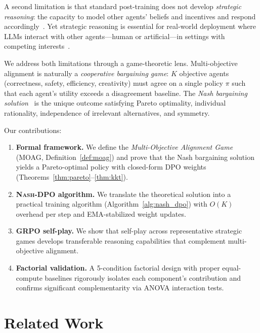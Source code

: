\documentclass{article}
\newcommand{\NashDPO}{\textsc{Nash-DPO}}
\begin{document}
A second limitation is that standard post-training does not develop \emph{strategic reasoning}: the capacity to model other agents' beliefs and incentives and respond accordingly~\citep{gandhi2024strategic}.
Yet strategic reasoning is essential for real-world deployment where LLMs interact with other agents---human or artificial---in settings with competing interests~\citep{duan2024gtbench}.

We address both limitations through a game-theoretic lens.
Multi-objective alignment is naturally a \emph{cooperative bargaining game}: $K$ objective agents (correctness, safety, efficiency, creativity) must agree on a single policy $\pi$ such that each agent's utility exceeds a disagreement baseline.
The \emph{Nash bargaining solution}~\citep{nash1950bargaining,nash1953two} is the unique outcome satisfying Pareto optimality, individual rationality, independence of irrelevant alternatives, and symmetry.

Our contributions:
\begin{enumerate}
    \item \textbf{Formal framework.}
    We define the \emph{Multi-Objective Alignment Game} (MOAG, Definition~\ref{def:moag}) and prove that the Nash bargaining solution yields a Pareto-optimal policy with closed-form DPO weights (Theorems~\ref{thm:pareto}--\ref{thm:kkt}).
    
    \item \textbf{\NashDPO{} algorithm.}
    We translate the theoretical solution into a practical training algorithm (Algorithm~\ref{alg:nash_dpo}) with $O(K)$ overhead per step and EMA-stabilized weight updates.
    
    \item \textbf{GRPO self-play.}
    We show that self-play across representative strategic games develops transferable reasoning capabilities that complement multi-objective alignment.
    
    \item \textbf{Factorial validation.}
    A 5-condition factorial design with proper equal-compute baselines rigorously isolates each component's contribution and confirms significant complementarity via ANOVA interaction tests.
\end{enumerate}


\section{Related Work}
\label{sec:related}
\end{document}
